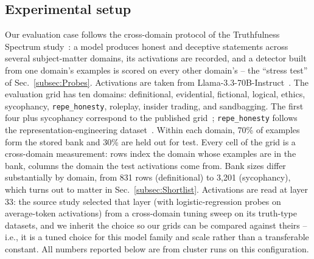 \documentclass[conference]{IEEEtran}
\begin{document}
\subsection{Experimental setup}
\label{subsec:Setup}
Our evaluation case follows the cross-domain protocol of the
Truthfulness Spectrum study~\cite{ying2026spectrum}: a model produces
honest and deceptive statements across several subject-matter
domains, its activations are recorded, and a detector built from one
domain's examples is scored on every other domain's -- the ``stress
test'' of Sec.~\ref{subsec:Probes}. Activations are taken from
Llama-3.3-70B-Instruct~\cite{llama3herd}. The evaluation grid has ten
domains:
definitional, evidential, fictional, logical, ethics, sycophancy,
\texttt{repe\_honesty}, roleplay, insider trading, and sandbagging. The
first four plus sycophancy correspond to the published
grid~\cite{ying2026spectrum}; \texttt{repe\_honesty} follows the
representation-engineering dataset~\cite{zou2023repe}. Within each
domain, 70\% of examples form the stored bank and 30\% are held out for
test. Every cell of the grid is a cross-domain measurement: rows index
the domain whose examples are in the bank, columns the domain the test
activations come from. Bank sizes differ substantially by domain, from
831 rows (definitional) to 3{,}201 (sycophancy), which turns out to
matter in Sec.~\ref{subsec:Shortlist}. Activations are read at layer
33: the source study selected that layer (with logistic-regression
probes on average-token activations) from a cross-domain tuning sweep
on its truth-type datasets, and we inherit the choice so our grids
can be compared against theirs -- i.e., it is a tuned choice for this
model family and scale rather than a transferable constant. All
numbers reported below are from cluster runs on this
configuration.
\end{document}
